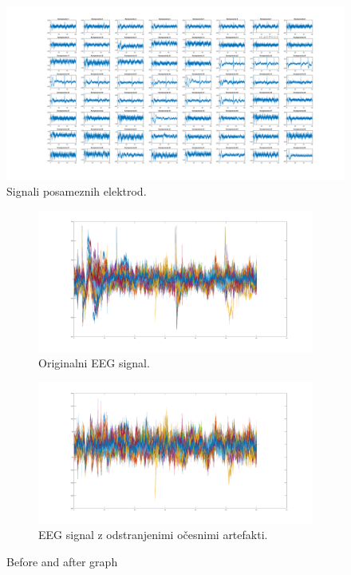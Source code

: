 \documentclass{article}
\begin{document}
\begin{figure}[H]
    \centering
    \includegraphics[width=\textwidth]{decompSigs.png}
    \caption{Signali posameznih elektrod.}
    \label{fig:decomposed}
\end{figure}



\begin{figure}[H]
    \begin{subfigure}{0.49\linewidth}
        \centering
        \includegraphics[width=\textwidth]{sigs.png}
        \caption{Originalni EEG signal.}\label{fig:original}
    \end{subfigure}
    \begin{subfigure}{0.49\linewidth}
        \centering
        \includegraphics[width=\textwidth]{newSigs.png}
        \caption{EEG signal z odstranjenimi očesnimi artefakti.}\label{fig:newSigs}
    \end{subfigure}
    \caption{Before and after graph}\label{fig:beforeAfter}
\end{figure}
\end{document}
